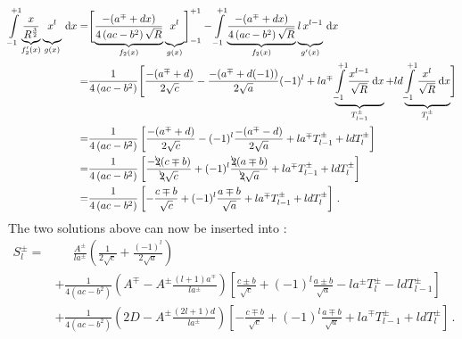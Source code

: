 \begin{align}
     \int\limits_{-1}^{+1}
       \underbrace{              \frac{x}{R^{\frac{3}{2}}}  }_{{f_2'}(x)}
       \underbrace{x^l \vphantom{\frac{x}{R^{\frac{3}{2}}}} }_{g(x)} \,\mathrm{d}x
  =&   \Biggl[ \underbrace{              \frac{-(a^{\mp} + d x)}{4\left(ac-b^2\right)\sqrt{R}} }_{f_2(x)}
               \underbrace{x^l \vphantom{\frac{-(a^{\mp} + d x)}{4\left(ac-b^2\right)\sqrt{R}}}}_{g(x)}
       \Biggr]_{-1}^{+1}
     - \int\limits_{-1}^{+1}
         \underbrace{                       \frac{-(a^{\mp} + d x)}{4\left(ac-b^2\right)\sqrt{R}} }_{f_2(x)}
         \underbrace{l \, x^{l-1} \vphantom{\frac{-(a^{\mp} + d x)}{4\left(ac-b^2\right)\sqrt{R}}}}_{{g'}(x)} \,\mathrm{d}x \nonumber \\
  =& \frac{1}{4\left(ac-b^2\right)} \Biggl[
       \frac{-(a^{\mp} + d     )}{2\sqrt{c}}
     - \frac{-(a^{\mp} + d (-1))}{2\sqrt{a}} (-1)^l
     + l a^{\mp} \underbrace{\int\limits_{-1}^{+1} \frac{x^{l-1}}{\sqrt{R}}\,\mathrm{d}x}_{T^{\pm}_{l-1}}
     + l d       \underbrace{\int\limits_{-1}^{+1} \frac{x^l    }{\sqrt{R}}\,\mathrm{d}x}_{T^{\pm}_l}
     \Biggr] \nonumber \\
  =& \frac{1}{4\left(ac-b^2\right)} \left[
                \frac{-(a^{\mp} + d)}{2\sqrt{c}}
       - (-1)^l \frac{-(a^{\mp} - d)}{2\sqrt{a}}
       + l a^{\mp} T^{\pm}_{l-1} + l d T^{\pm}_l \right] \nonumber \\
  =& \frac{1}{4\left(ac-b^2\right)} \left[
                \frac{-\bcancel{2}(c \mp b)}{\bcancel{2}\sqrt{c}}
       + (-1)^l \frac{ \bcancel{2}(a \mp b)}{\bcancel{2}\sqrt{a}}
       + l a^{\mp} T^{\pm}_{l-1} + l d T^{\pm}_l \right] \nonumber \\
  =& \frac{1}{4\left(ac-b^2\right)} \left[
       -        \frac{c \mp b}{\sqrt{c}}
       + (-1)^l \frac{a \mp b}{\sqrt{a}}
       + l a^{\mp} T^{\pm}_{l-1} + l d T^{\pm}_l \right] \, .
\end{align}
The two solutions above can now be inserted into :
\begin{align}
  S^{\pm}_l
  =& \phantom{+}~ \frac{A^{\pm}}{l a^{\pm}}
                  \left( \frac{1}{2 \sqrt{c}} + \frac{(-1)^l    }{2 \sqrt{a}} \right) \nonumber \\
  ~&          +   \frac{1}{4\left(ac-b^2\right)}
                  \left( A^{\mp} - A^{\pm} \frac{(l+1)a^{\mp}}{l a^{\pm}} \right)
                  \left[
                             \frac{c \pm b}{\sqrt{c}}
                    + (-1)^l \frac{a \pm b}{\sqrt{a}}
                    - l a^{\pm} T^{\pm}_l - l d T^{\pm}_{l-1} \right] \nonumber \\
  ~&          +   \frac{1}{4\left(ac-b^2\right)}
                  \left( 2 D     - A^{\pm} \frac{(2l+1)d}{l a^{\pm}}      \right)
                  \left[
                     -        \frac{c \mp b}{\sqrt{c}}
                     + (-1)^l \frac{a \mp b}{\sqrt{a}}
                     + l a^{\mp} T^{\pm}_{l-1} + l d T^{\pm}_l \right] \, .
\end{align}
